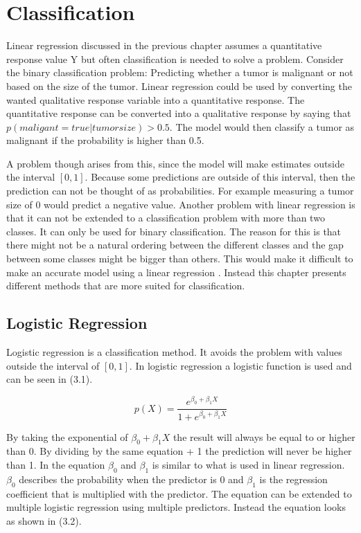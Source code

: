 \chapter{Classification}
Linear regression discussed in the previous chapter assumes a quantitative response value Y but often classification is needed to solve a problem. Consider the binary classification problem: Predicting whether a tumor is malignant or not based on the size of the tumor. Linear regression could be used by converting the wanted qualitative response variable into a quantitative response. The quantitative response can be converted into a qualitative response by saying that $p(maligant = true | tumorsize) > 0.5$. The model would then classify a tumor as malignant if the probability is higher than 0.5. 

A problem though arises from this, since the model will make estimates outside the interval $[0,1]$. Because some predictions are outside of this interval, then the prediction can not be thought of as probabilities. For example measuring a tumor size of 0 would predict a negative value. Another problem with linear regression is that it can not be extended to a classification problem with more than two classes. It can only be used for binary classification. The reason for this is that there might not be a natural ordering between the different classes and the gap between some classes might be bigger than others. This would make it difficult to make an accurate model using a linear regression \citep[pp. 129-130]{ISLR}. Instead this chapter presents different methods that are more suited for classification.

\section{Logistic Regression}
\label{chp:logreg}
Logistic regression is a classification method. It avoids the problem with values outside the interval of $[0,1]$. In logistic regression a logistic function is used and can be seen in (3.1).

\begin{equation}
	p(X) = \dfrac{e^{\beta_0 + \beta_1 X}}{1 + e^{\beta_0 + \beta_1 X}}
\end{equation}

By taking the exponential of $\beta_0 + \beta_1 X$ the result will always be equal to or higher than 0. By dividing by the same equation + 1 the prediction will never be higher than 1. In the equation $\beta_0$ and $\beta_1$ is similar to what is used in linear regression. $\beta_0$ describes the probability when the predictor is 0 and $\beta_1$ is the regression coefficient that is multiplied  with the predictor. The equation can be extended to multiple logistic regression using multiple predictors. Instead the equation looks as shown in (3.2).

